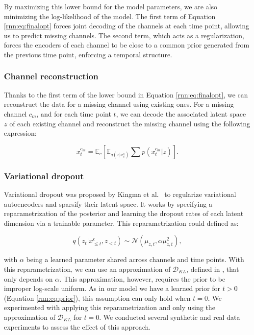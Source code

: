 By maximizing this lower bound for the model parameters, we are also minimizing the log-likelihood of the model. The first term of Equation \ref{rnn:eq:finalopt} forces joint decoding of the channels at each time point, allowing us to predict missing channels. The second term, which acts as a regularization, forces the encoders of each channel to be close to a common prior generated from the previous time point, enforcing a temporal structure.

\subsubsection{Channel reconstruction}\label{sec:channelrec}
Thanks to the first term of the lower bound in Equation \ref{rnn:eq:finalopt}, we can reconstruct the data for a missing channel using existing ones. For a missing channel $c_{m}$, and for each time point $t$, we can decode the associated latent space $z$ of each existing channel and reconstruct the missing channel using the following expression:

\begin{equation}
    x^{c_m}_t = \mathbb{E}_{c} [ \mathbb{E}_{q(z|x^c_t)} \sum p(x^{c_m}_t|z) ].
\end{equation}

\subsubsection{Variational dropout} 

Variational dropout was proposed by Kingma et al.\ \cite{Kingma2015} to regularize variational autoencoders and sparsify their latent space. It works by specifying a reparametrization of the posterior and learning the dropout rates of each latent dimension via a trainable parameter. This reparametrization could defined as:

\begin{equation}
    \mathit{q}(z_t | x^c_{\leq t}, z_{< t}) \sim \mathcal{N}(\mu_{z,t},\alpha\mu_{z,t}^2),
\end{equation}

with $\alpha$ being a learned parameter shared across channels and time points. With this reparametrization, we can use an approximation of $\mathcal{D}_{KL}$, defined in \cite{Kingma2015}, that only depends on $\alpha$. This approximation, however, requires the prior to be improper log-scale uniform. As in our model we have a learned prior for $t>0$ (Equation \ref{rnn:eq:prior}), this assumption can only hold when $t=0$. We experimented with applying this reparametrization and only using the approximation of $\mathcal{D}_{KL}$ for $t=0$. We conducted several synthetic and real data experiments to assess the effect of this approach.

